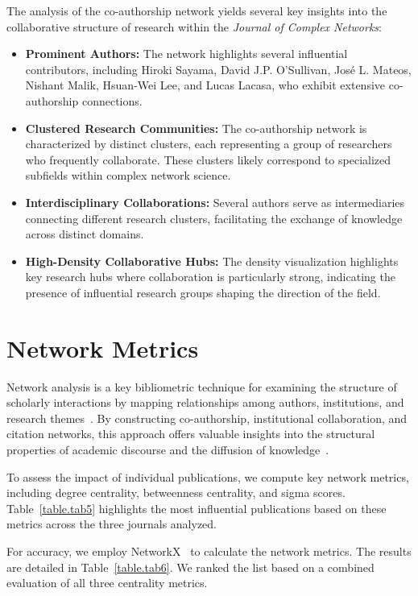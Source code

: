 \documentclass[twocolumn]{article}
\begin{document}
		The analysis of the co-authorship network yields several key insights into the collaborative structure of research within the \textit{Journal of Complex Networks}:
		
		\begin{itemize}
			\item \textbf{Prominent Authors:} The network highlights several influential contributors, including Hiroki Sayama, David J.P. O’Sullivan, José L. Mateos, Nishant Malik, Hsuan-Wei Lee, and Lucas Lacasa, who exhibit extensive co-authorship connections.
			\item \textbf{Clustered Research Communities:} The co-authorship network is characterized by distinct clusters, each representing a group of researchers who frequently collaborate. These clusters likely correspond to specialized subfields within complex network science.
			\item \textbf{Interdisciplinary Collaborations:} Several authors serve as intermediaries connecting different research clusters, facilitating the exchange of knowledge across distinct domains.
			\item \textbf{High-Density Collaborative Hubs:} The density visualization highlights key research hubs where collaboration is particularly strong, indicating the presence of influential research groups shaping the direction of the field.
		\end{itemize}
		
		\section{Network Metrics}
		
		Network analysis is a key bibliometric technique for examining the structure of scholarly interactions by mapping relationships among authors, institutions, and research themes~\cite{Newman2001, Barabasi2002, Borgatti2009}. By constructing co-authorship, institutional collaboration, and citation networks, this approach offers valuable insights into the structural properties of academic discourse and the diffusion of knowledge~\cite{Otte2002, Liu2005}.
		
		To assess the impact of individual publications, we compute key network metrics, including degree centrality, betweenness centrality, and sigma scores. Table~\ref{table.tab5} highlights the most influential publications based on these metrics across the three journals analyzed.
		
		For accuracy, we employ NetworkX~\cite{SciPyProceedings_11} to calculate the network metrics. The results are detailed in Table~\ref{table.tab6}. We ranked the list based on a combined evaluation of all three centrality metrics.
		
\end{document}
